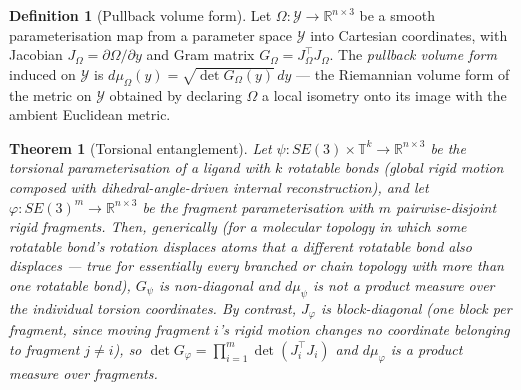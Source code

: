 \documentclass[11pt,a4paper]{report}
\newtheorem{theorem}{Theorem}[chapter]
\theoremstyle{definition}
\newtheorem{definition}[definition]{Definition}
\theoremstyle{remark}
\newcommand{\RR}{\mathbb R}
\begin{document}
\begin{definition}[Pullback volume form]
\label{def:pullback-volume}
Let $\Omega:\mathcal Y\to\RR^{n\times3}$ be a smooth parameterisation map
from a parameter space $\mathcal Y$ into Cartesian coordinates, with
Jacobian $J_\Omega=\partial\Omega/\partial y$ and Gram matrix
$G_\Omega=J_\Omega^\top J_\Omega$. The \emph{pullback volume form} induced
on $\mathcal Y$ is $d\mu_\Omega(y) = \sqrt{\det G_\Omega(y)}\,dy$ ---
the Riemannian volume form of the metric on $\mathcal Y$ obtained by
declaring $\Omega$ a local isometry onto its image with the ambient
Euclidean metric.
\end{definition}

\begin{theorem}[Torsional entanglement]
\label{thm:entanglement-scratch}
Let $\psi:SE(3)\times\mathbb T^k\to\RR^{n\times3}$ be the torsional
parameterisation of a ligand with $k$ rotatable bonds (global rigid motion
composed with dihedral-angle-driven internal reconstruction), and let
$\varphi:SE(3)^m\to\RR^{n\times3}$ be the fragment parameterisation with
$m$ pairwise-disjoint rigid fragments. Then, generically (for a molecular
topology in which some rotatable bond's rotation displaces atoms that a
different rotatable bond also displaces --- true for essentially every
branched or chain topology with more than one rotatable bond),
$G_\psi$ is non-diagonal and $d\mu_\psi$ is not a product measure over the
individual torsion coordinates. By contrast, $J_\varphi$ is block-diagonal
(one block per fragment, since moving fragment $i$'s rigid motion changes
no coordinate belonging to fragment $j\ne i$), so
$\det G_\varphi = \prod_{i=1}^m\det(J_i^\top J_i)$ and $d\mu_\varphi$
\emph{is} a product measure over fragments.
\end{theorem}
\end{document}
